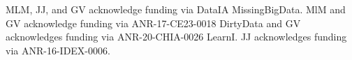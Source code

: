 \documentclass{article}
\theoremstyle{plain}
\begin{document}
\begin{ack}
MLM, JJ, and GV acknowledge funding via DataIA MissingBigData. MlM and GV acknowledge funding via ANR-17-CE23-0018 DirtyData and GV acknowledges funding via ANR-20-CHIA-0026 LearnI.
JJ acknowledges funding via ANR-16-IDEX-0006.
\end{ack}









\end{document}
